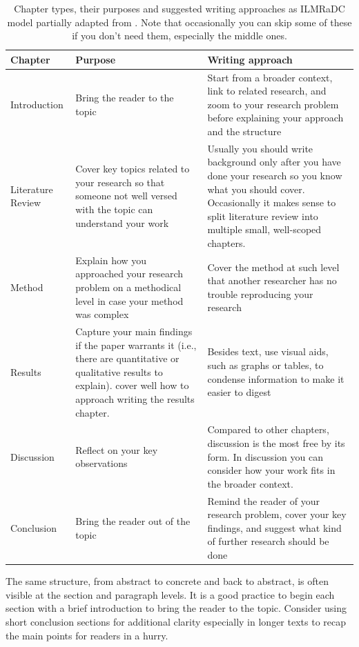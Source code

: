 \begin{table}
    \begin{tabular}{p{2.0cm}|p{4.0cm}|p{6.0cm}}
        Chapter & Purpose & Writing approach \\
        \hline
        Introduction & Bring the reader to the topic & Start from a broader context, link to related research, and zoom to your research problem before explaining your approach and the structure \\
        Literature \newline Review & Cover key topics related to your research so that someone not well versed with the topic can understand your work & Usually you should write background only after you have done your research so you know what you should cover. Occasionally it makes sense to split literature review into multiple small, well-scoped chapters. \\
        Method & Explain how you approached your research problem on a methodical level in case your method was complex & Cover the method at such level that another researcher has no trouble reproducing your research \\
        Results & Capture your main findings if the paper warrants it (i.e., there are quantitative or qualitative results to explain). \citet{ecarnot2015writing} cover well how to approach writing the results chapter. & Besides text, use visual aids, such as graphs or tables, to condense information to make it easier to digest \\
        Discussion & Reflect on your key observations & Compared to other chapters, discussion is the most free by its form. In discussion you can consider how your work fits in the broader context. \\
        Conclusion & Bring the reader out of the topic & Remind the reader of your research problem, cover your key findings, and suggest what kind of further research should be done \\
    \end{tabular}
    \caption{Chapter types, their purposes and suggested writing approaches as ILMRaDC model partially adapted from \cite{botchkarev2025academic}. Note that occasionally you can skip some of these if you don't need them, especially the middle ones.}
    \label{table:ilmrad}
\end{table}

The same structure, from abstract to concrete and back to abstract, is often visible at the section and paragraph levels.
It is a good practice to begin each section with a brief introduction to bring the reader to the topic.
Consider using short conclusion sections for additional clarity especially in longer texts to recap the main points for readers in a hurry.

